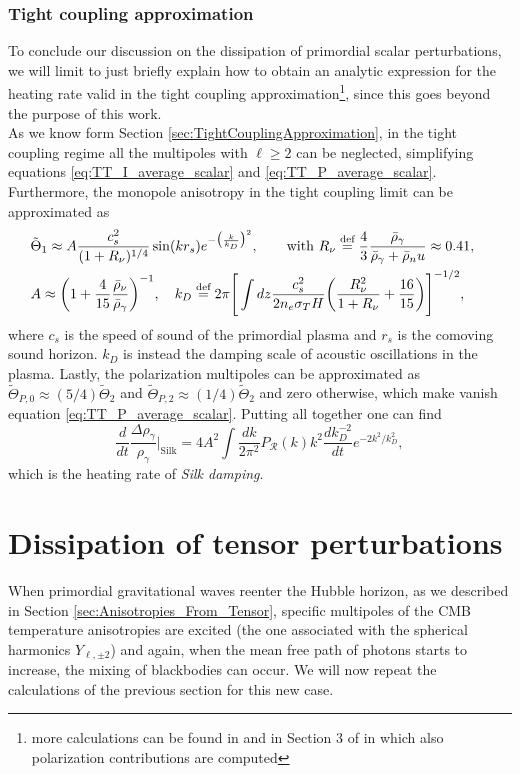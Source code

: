 \subsubsection{Tight coupling approximation}
To conclude our discussion on the dissipation of primordial scalar perturbations, we will limit to just briefly explain how to obtain an analytic expression for the heating rate valid in the tight coupling approximation\footnote{more calculations can be found in \cite{Chluba_2x2} and in Section 3 of \cite{Chluba_tens_diss} in which also polarization contributions are computed}, since this goes beyond the purpose of this work.\\
As we know form Section \ref{sec:TightCouplingApproximation}, in the tight coupling regime all the multipoles with $\ell\geq2$ can be neglected, simplifying equations \eqref{eq:TT_I_average_scalar} and \eqref{eq:TT_P_average_scalar}. Furthermore, the monopole anisotropy in the tight coupling limit can be approximated as
\begin{align*}
    &\tilde\Theta_1\approx A\frac{c_s^2}{(1+R_\nu)^{1/4}}\sin(kr_s)e^{-\big(\frac{k}{k_D}\big)^2},\qquad \text{with }R_\nu\stackrel{\text{def}}{=} \frac{4}{3}\frac{\bar\rho_\gamma}{\bar\rho_\gamma+\bar\rho_nu}\approx0.41 ,&&\\ &A\approx\bigg(1+\frac{4}{15}\frac{\bar\rho_\nu}{\bar\rho_\gamma}\bigg)^{-1},\quad k_D\stackrel{\text{def}}{=}2\pi\Bigg[\int dz\frac{c_s^2}{2n_e\sigma_T H}\bigg(\frac{R_\nu^2}{1+R_\nu}+\frac{16}{15}\bigg)\Bigg]^{-1/2},&&
\end{align*}
where $c_s$ is the speed of sound of the primordial plasma and $r_s$ is the comoving sound horizon. $k_D$ is instead the damping scale of acoustic oscillations in the plasma.  Lastly, the polarization multipoles can be approximated as $\tilde \Theta_{P,0}\approx (5/4)\tilde\Theta_2$ and $\tilde \Theta_{P,2}\approx (1/4)\tilde\Theta_2$ and zero otherwise, which make vanish equation \eqref{eq:TT_P_average_scalar}. Putting all together one can find 
\begin{equation}
    \frac{d}{dt}\frac{\Delta \rho_\gamma}{\rho_\gamma}\Bigg|_\text{Silk}=4A^2\int\frac{dk}{2\pi^2}P_\mathcal R(k)k^2 \frac{dk_D^{-2}}{dt}e^{-2 {k^2}/{k_D^2}},
\end{equation}
which is the heating rate of \emph{Silk damping}.

\section{Dissipation of tensor perturbations}
When primordial gravitational waves reenter the Hubble horizon, as we described in Section \ref{sec:Anisotropies_From_Tensor}, specific multipoles of the CMB temperature anisotropies are excited (the one associated with the spherical harmonics $Y_{\ell,\pm2}$) and again, when the mean free path of photons starts to increase, the mixing of blackbodies can occur. We will now repeat the calculations of the previous section for this new case.

